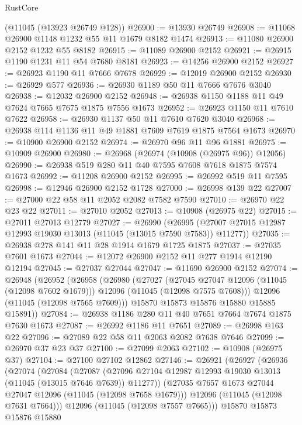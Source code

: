 \begin{lexlean}{RustCore}
\begin{coremodule}
    (@11045 (@13923 @26749 @128))
@26900 := @13930 @26749
@26908 := @11068 @26900 @1148 @1232 @55 @11 @1679 @8182 @1474
@26913 := @11080 @26900 @2152 @1232 @55 @8182
@26915 := @11089 @26900 @2152
@26921 := @26915 @1190 @1231 @11 @54 @7680 @8181
@26923 := @14256 @26900 @2152
@26927 := @26923 @1190 @11 @7666 @7678
@26929 := @12019 @26900 @2152
@26930 := @26929 @577
@26936 := @26930 @1189 @50 @11 @7666 @7676 @3040
@26938 := @12032 @26900 @2152
@26948 := @26938 @1150 @1188 @11 @49 @7624 @7665 @7675 @1875 @7556 @1673
@26952 := @26923 @1150 @11 @7610 @7622
@26958 := @26930 @1137 @50 @11 @7610 @7620 @3040
@26968 := @26938 @114 @1136 @11 @49 @1881 @7609 @7619 @1875 @7564 @1673
@26970 := @10900 @26900 @2152
@26974 := @26970 @96 @11 @96 @1881
@26975 := @10909 @26900
@26980 := @26968 (@26974 (@10908 (@26975 @96)) @12056)
@26990 := @26938 @519 @280 @11 @40 @7595 @7608 @7618 @1875 @7574 @1673
@26992 := @11208 @26900 @2152
@26995 := @26992 @519 @11 @7595
@26998 := @12946 @26900 @2152 @1728
@27000 := @26998 @139 @22
@27007 := @27000 @22 @58 @11 @2052 @2082 @7582 @7590
@27010 := @26970 @22 @23 @22
@27011 := @27010 @2052
@27013 := @10908 (@26975 @22)
@27015 := @27011 @27013 @12779
@27027 := @26990
    (@26995 (@27007 @27015 @12987 @12993 @19030 @13013 (@11045 (@13015 @7590 @7583)) @11277))
@27035 := @26938 @278 @141 @11 @28 @1914 @1679 @1725 @1875
@27037 := @27035 @7601 @1673
@27044 := @12072 @26900 @2152 @11 @277 @1914 @12190 @12194
@27045 := @27037 @27044
@27047 := @11690 @26900 @2152
@27074 := @26948
    (@26952
      (@26958
        (@26980
          (@27027
            (@27045 @27047 @12096 (@11045 (@12098 @7602 @1679)))
            @12096
            (@11045 (@12098 @7575 @7608)))
          @12096
          (@11045 (@12098 @7565 @7609)))
        @15870
        @15873
        @15876
        @15880
        @15885
        @15891))
@27084 := @26938 @1186 @280 @11 @40 @7651 @7664 @7674 @1875 @7630 @1673
@27087 := @26992 @1186 @11 @7651
@27089 := @26998 @163 @22
@27096 := @27089 @22 @58 @11 @2063 @2082 @7638 @7646
@27099 := @26970 @37 @23 @37
@27100 := @27099 @2063
@27102 := @10908 (@26975 @37)
@27104 := @27100 @27102 @12862
@27146 := @26921
    (@26927
      (@26936
        (@27074
          (@27084
            (@27087
              (@27096 @27104 @12987 @12993 @19030 @13013 (@11045 (@13015 @7646 @7639)) @11277))
            (@27035 @7657 @1673 @27044 @27047 @12096 (@11045 (@12098 @7658 @1679)))
            @12096
            (@11045 (@12098 @7631 @7664)))
          @12096
          (@11045 (@12098 @7557 @7665)))
        @15870
        @15873
        @15876
        @15880

\end{coremodule}
\end{lexlean}

